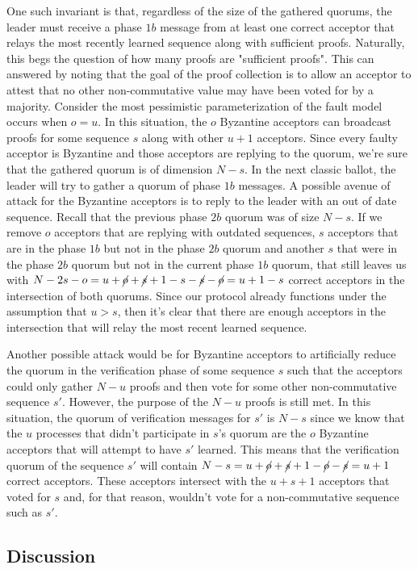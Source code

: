 One such invariant is that, regardless of the size of the gathered quorums, the leader must receive a phase $1b$ message from at least one correct acceptor that relays the most recently learned sequence along with sufficient proofs. Naturally, this begs the question of how many proofs are "sufficient proofs". This can answered by noting that the goal of the proof collection is to allow an acceptor to attest that no other non-commutative value may have been voted for by a majority. Consider the most pessimistic parameterization of the fault model occurs when $o=u$. In this situation, the $o$ Byzantine acceptors can broadcast proofs for some sequence $s$ along with other $u+1$ acceptors. Since every faulty acceptor is Byzantine and those acceptors are replying to the quorum, we're sure that the gathered quorum is of dimension $N-s$. In the next classic ballot, the leader will try to gather a quorum of phase $1b$ messages. A possible avenue of attack for the Byzantine acceptors is to reply to the leader with an out of date sequence. Recall that the previous phase $2b$ quorum was of size $N-s$. If we remove $o$ acceptors that are replying with outdated sequences, $s$ acceptors that are in the phase $1b$ but not in the phase $2b$ quorum and another $s$ that were in the phase $2b$ quorum but not in the current phase $1b$ quorum, that still leaves us with $N-2s-o=u+\cancel{o}+\cancel{s}+1-s-\cancel{s}-\cancel{o}=u+1-s$ correct acceptors in the intersection of both quorums. Since our protocol already functions under the assumption that $u>s$, then it's clear that there are enough acceptors in the intersection that will relay the most recent learned sequence.\par
Another possible attack would be for Byzantine acceptors to artificially reduce the quorum in the verification phase of some sequence $s$ such that the acceptors could only gather $N-u$ proofs and then vote for some other non-commutative sequence $s'$. However, the purpose of the $N-u$ proofs is still met. In this situation, the quorum of verification messages for $s'$ is $N-s$ since we know that the $u$ processes that didn't participate in $s$'s quorum are the $o$ Byzantine acceptors that will attempt to have $s'$ learned. This means that the verification quorum of the sequence $s'$ will contain $N-s=u+\cancel{o}+\cancel{s}+1-\cancel{o}-\cancel{s}=u+1$ correct acceptors. These acceptors intersect with the $u+s+1$ acceptors that voted for $s$ and, for that reason, wouldn't vote for a non-commutative sequence such as $s'$.
\fi
\subsection{Discussion}

